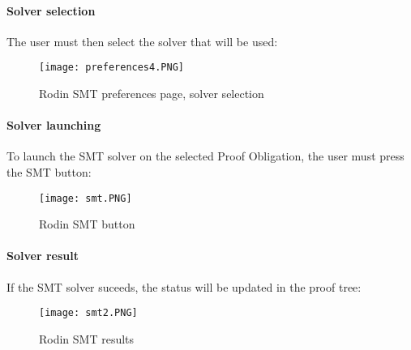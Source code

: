 \paragraph{Solver selection}
The user must then select the solver that will be used:

\begin{figure}
\centering
\texttt{[image: preferences4.PNG]}
\caption{Rodin SMT preferences page, solver selection} 
\label{Fig: Solver selection in SMT preferences}
\end{figure}

\paragraph{Solver launching}
To launch the SMT solver on the selected Proof Obligation, the user must press the SMT button:
\begin{figure}
\centering
\texttt{[image: smt.PNG]}
\caption{Rodin SMT button} 
\label{Fig: Launch SMT in Rodin}
\end{figure}

\paragraph{Solver result}
If the SMT solver suceeds, the status will be updated in the proof tree:

\begin{figure}
\centering
\texttt{[image: smt2.PNG]}
\caption{Rodin SMT results} 
\label{Fig: SMT results}
\end{figure}


